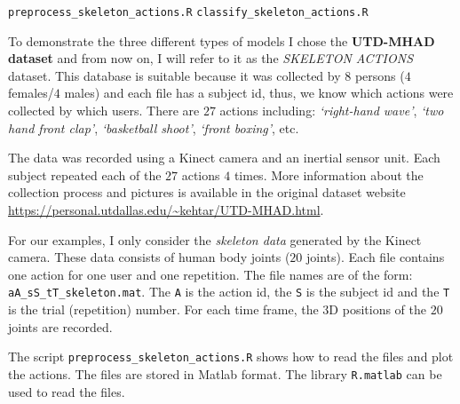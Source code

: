 \documentclass[
  11pt,
]{krantz}
\makeatletter
\newenvironment{Shaded}{\begin{snugshade}}{\end{snugshade}}
\newcommand{\CommentTok}[1]{\textcolor[rgb]{0.37,0.37,0.37}{\textit{#1}}}
\newcommand{\FunctionTok}[1]{\textcolor[rgb]{0,0,0}{#1}}
\newcommand{\NormalTok}[1]{#1}
\newcommand{\OtherTok}[1]{\textcolor[rgb]{0.37,0.37,0.37}{#1}}
\newcommand{\SpecialCharTok}[1]{\textcolor[rgb]{0,0,0}{#1}}
\newcommand{\StringTok}[1]{\textcolor[rgb]{0.5,0.5,0.5}{#1}}
\newenvironment{kframe}{%
\medskip{}
\setlength{\fboxsep}{.8em}
 \def\at@end@of@kframe{}%
 \ifinner\ifhmode%
  \def\at@end@of@kframe{\end{minipage}}%
  \begin{minipage}{\columnwidth}%
 \fi\fi%
 \def\FrameCommand##1{\hskip\@totalleftmargin \hskip-\fboxsep
 \colorbox{shadecolor}{##1}\hskip-\fboxsep
     \hskip-\linewidth \hskip-\@totalleftmargin \hskip\columnwidth}%
 \MakeFramed {\advance\hsize-\width
   \@totalleftmargin\z@ \linewidth\hsize
   \@setminipage}}%
 {\par\unskip\endMakeFramed%
 \at@end@of@kframe}
\newenvironment{rmdblock}[1]
  {
  \begin{itemize}
  \renewcommand{\labelitemi}{
    \raisebox{-.7\height}[0pt][0pt]{
      {\setkeys{Gin}{width=3em,keepaspectratio}\texttt{[image: images/icons/\#1]}}
    }
  }
  \setlength{\fboxsep}{1em}
  \begin{kframe}
  \item
  }
  {
  \end{kframe}
  \end{itemize}
  }
\newenvironment{rmdfolder}
  {\begin{rmdblock}{folder}}
  {\end{rmdblock}}
\makeatother
\begin{document}
\begin{rmdfolder}
\texttt{preprocess\_skeleton\_actions.R} \texttt{classify\_skeleton\_actions.R}
\end{rmdfolder}

To demonstrate the three different types of models I chose the \textbf{UTD-MHAD dataset} \citep{chen2015utd} and from now on, I will refer to it as the \emph{SKELETON ACTIONS} dataset. This database is suitable because it was collected by \(8\) persons (\(4\) females/\(4\) males) and each file has a subject id, thus, we know which actions were collected by which users. There are \(27\) actions including: \emph{`right-hand wave'}, \emph{`two hand front clap'}, \emph{`basketball shoot'}, \emph{`front boxing'}, etc.

The data was recorded using a Kinect camera and an inertial sensor unit. Each subject repeated each of the \(27\) actions \(4\) times. More information about the collection process and pictures is available in the original dataset website \url{https://personal.utdallas.edu/~kehtar/UTD-MHAD.html}.

For our examples, I only consider the \emph{skeleton data} generated by the Kinect camera. These data consists of human body joints (\(20\) joints). Each file contains one action for one user and one repetition. The file names are of the form: \texttt{aA\_sS\_tT\_skeleton.mat}. The \texttt{A} is the action id, the \texttt{S} is the subject id and the \texttt{T} is the trial (repetition) number. For each time frame, the \(3\)D positions of the \(20\) joints are recorded.

The script \texttt{preprocess\_skeleton\_actions.R} shows how to read the files and plot the actions. The files are stored in Matlab format. The library \texttt{R.matlab} \citep{rmatlab} can be used to read the files.

\begin{Shaded}
\end{Shaded}
\end{document}
